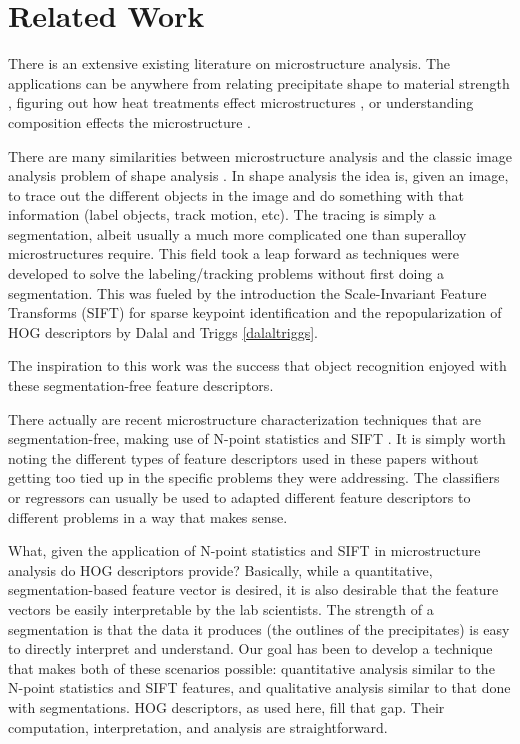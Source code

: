 \documentclass[review]{elsarticle}
\begin{document}
	\section{Related Work}\label{relatedwork}
		There is an extensive existing literature on microstructure analysis. The applications can be anywhere from relating precipitate shape to material strength \cite{sluytman}, figuring out how heat treatments effect microstructures \cite{gabb2011}, or understanding composition effects the microstructure \cite{stin2000} \cite{faehrmann}.
		
		There are many similarities between microstructure analysis and the classic image analysis problem of shape analysis \cite{stegmann} \cite{belongie}. In shape analysis the idea is, given an image, to trace out the different objects in the image and do something with that information (label objects, track motion, etc). The tracing is simply a segmentation, albeit usually a much more complicated one than superalloy microstructures require. This field took a leap forward as techniques were developed to solve the labeling/tracking problems without first doing a segmentation. This was fueled by the introduction the Scale-Invariant Feature Transforms (SIFT) \cite{sift} for sparse keypoint identification and the repopularization of HOG descriptors by Dalal and Triggs \ref{dalaltriggs}.
		
		The inspiration to this work was the success that object recognition enjoyed with these segmentation-free feature descriptors.

		There actually are recent microstructure characterization techniques that are segmentation-free, making use of N-point statistics \cite{kalidindi1, kalidindi2} and SIFT \cite{decost}. It is simply worth noting the different types of feature descriptors used in these papers without getting too tied up in the specific problems they were addressing. The classifiers or regressors can usually be used to adapted different feature descriptors to different problems in a way that makes sense.
		 
		What, given the application of N-point statistics and SIFT in microstructure analysis do HOG descriptors provide? Basically, while a quantitative, segmentation-based feature vector is desired, it is also desirable that the feature vectors be easily interpretable by the lab scientists. The strength of a segmentation is that the data it produces (the outlines of the precipitates) is easy to directly interpret and understand. Our goal has been to develop a technique that makes both of these scenarios possible: quantitative analysis similar to the N-point statistics and SIFT features, and qualitative analysis similar to that done with segmentations. HOG descriptors, as used here, fill that gap. Their computation, interpretation, and analysis are straightforward.
	
\end{document}
